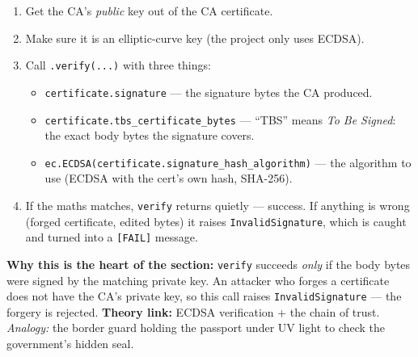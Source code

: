 \documentclass[11pt,a4paper]{report}
\begin{document}
\begin{enumerate}
  \item Get the CA's \emph{public} key out of the CA certificate.
  \item Make sure it is an elliptic-curve key (the project only uses ECDSA).
  \item Call \texttt{.verify(...)} with three things:
        \begin{itemize}
          \item \texttt{certificate.signature} --- the signature bytes the CA produced.
          \item \texttt{certificate.tbs\_certificate\_bytes} --- ``TBS'' means
                \emph{To Be Signed}: the exact body bytes the signature covers.
          \item \texttt{ec.ECDSA(certificate.signature\_hash\_algorithm)} --- the
                algorithm to use (ECDSA with the cert's own hash, SHA-256).
        \end{itemize}
  \item If the maths matches, \texttt{verify} returns quietly --- success.
        If anything is wrong (forged certificate, edited bytes) it raises
        \texttt{InvalidSignature}, which is caught and turned into a
        \texttt{[FAIL]} message.
\end{enumerate}
\textbf{Why this is the heart of the section:} \texttt{verify} succeeds
\emph{only} if the body bytes were signed by the matching private key. An
attacker who forges a certificate does not have the CA's private key, so this
call raises \texttt{InvalidSignature} --- the forgery is rejected.
\textbf{Theory link:} ECDSA verification + the chain of trust. \emph{Analogy:}
the border guard holding the passport under UV light to check the government's
hidden seal.
\end{document}
